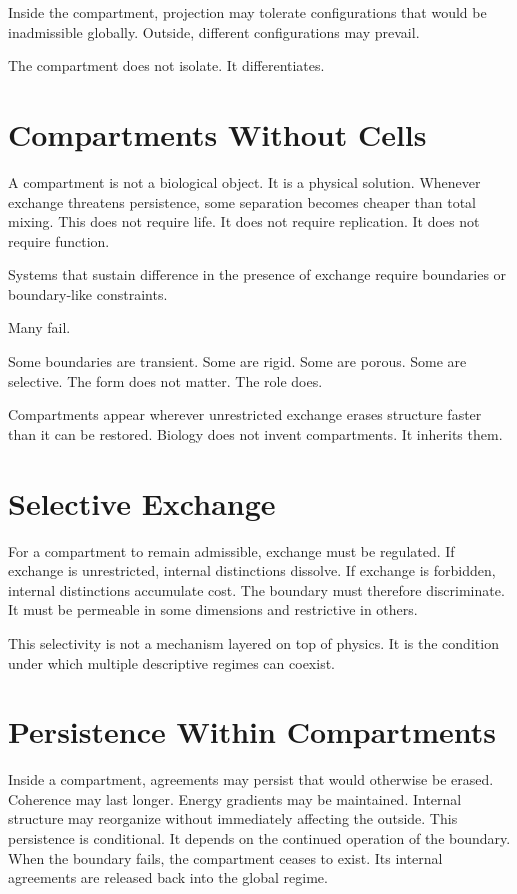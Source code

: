 \documentclass[11pt,twoside,openright]{book}
\begin{document}
Inside the compartment, projection may tolerate configurations that would be inadmissible globally. Outside, different configurations may prevail.

The compartment does not isolate.
It differentiates.
\section*{Compartments Without Cells}

A compartment is not a biological object. It is a physical solution. Whenever exchange threatens persistence, some separation becomes cheaper than total mixing. This does not require life. It does not require replication. It does not require function.

Systems that sustain difference in the presence of exchange require boundaries or boundary-like constraints.

Many fail.

Some boundaries are transient. Some are rigid. Some are porous. Some are selective. The form does not matter. The role does.

Compartments appear wherever unrestricted exchange erases structure faster than it can be restored. Biology does not invent compartments. It inherits them.

\section*{Selective Exchange}

For a compartment to remain admissible, exchange must be regulated. If exchange is unrestricted, internal distinctions dissolve. If exchange is forbidden, internal distinctions accumulate cost. The boundary must therefore discriminate. It must be permeable in some dimensions and restrictive in others.

This selectivity is not a mechanism layered on top of physics. It is the condition under which multiple descriptive regimes can coexist.

\section*{Persistence Within Compartments}

Inside a compartment, agreements may persist that would otherwise be erased. Coherence may last longer. Energy gradients may be maintained. Internal structure may reorganize without immediately affecting the outside. This persistence is conditional. It depends on the continued operation of the boundary. When the boundary fails, the compartment ceases to exist. Its internal agreements are released back into the global regime.
\end{document}
